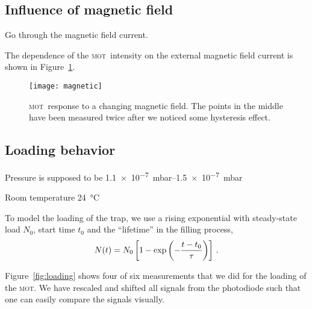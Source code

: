 \documentclass[11pt, english, fleqn, DIV=15, headinclude, BCOR=2cm]{scrreprt}
\newcommand\mot{\textsc{mot}}
\begin{document}
\subsection{Influence of magnetic field}

Go through the magnetic field current.



The dependence of the \mot\ intensity on the external magnetic field current is
shown in Figure~\ref{fig:magnetic}.

\begin{figure}
    \centering
    \texttt{[image: magnetic]}
    \caption{%
        \mot\ response to a changing magnetic field. The points in the middle
        have been measured twice after we noticed some hysteresis effect.
    }
    \label{fig:magnetic}
\end{figure}

\subsection{Loading behavior}

Pressure is supposed to be \SIrange{1.1e-7}{1.5e-7}{\milli\bar}

Room temperature \SI{24}{\celsius}

To model the loading of the trap, we use a rising exponential with steady-state
load $N_0$, start time $t_0$ and the \enquote{lifetime} in the filling process,
\[
    N(t) = N_0 \left[ 1 - \exp\left( - \frac{t - t_0}{\tau} \right) \right] \,.
\]

Figure~\ref{fig:loading} shows four of six measurements that we did for the
loading of the \mot. We have rescaled and shifted all signals from the
photodiode such that one can easily compare the signals visually.
\end{document}
